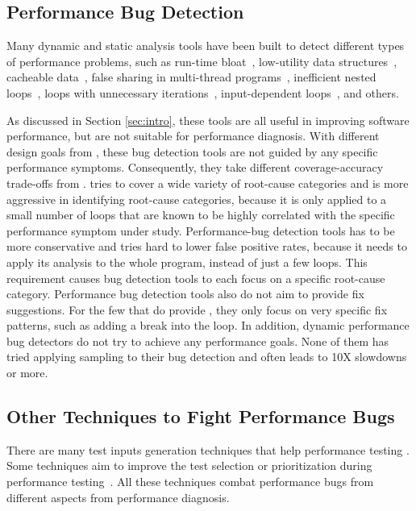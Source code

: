 \subsection{Performance Bug Detection}

Many dynamic and static analysis tools have been built to detect different
types of performance problems, such as 
run-time bloat~\cite{Dufour:2008:STC:1453101.1453111, Xu:2009:GFP:1542476.1542523, Xu:2010:DIC:1806596.1806616}, 
low-utility data structures~\cite{Xu:2010:FLD:1806596.1806617}, 
cacheable data~\cite{Cachetor}, false sharing in
multi-thread programs~\cite{Liu:2011:SPD:2048066.2048070},
inefficient nested loops~\cite{Alabama},
loops with unnecessary iterations~\cite{CARAMEL,IsilDillig.PLDI15},
input-dependent loops~\cite{xiao13:context}, and others. 

As discussed in 
Section \ref{sec:intro}, these tools are all useful in improving software
performance, but are not suitable for performance diagnosis.
With different design goals from \Tool, these bug detection tools are not 
guided by any specific
performance symptoms. Consequently, they take different coverage-accuracy
trade-offs from \Tool. \Tool tries to cover a wide variety of root-cause 
categories and is more aggressive in identifying root-cause categories, because
it is only applied to a small number of loops that are known to be highly
correlated with the specific performance symptom under study.
Performance-bug detection tools has to be more conservative and tries hard
to lower false positive rates, because it needs to apply its analysis to the
whole program, instead of just a few loops. This requirement causes bug
detection tools to each focus on a specific root-cause category.
Performance bug detection tools also do not aim to provide fix suggestions.
For the few that do provide \cite{CARAMEL}, they only focus on very specific
fix patterns, such as adding a break into the loop. 
In addition, dynamic performance bug detectors do not try to achieve any
performance goals. None of them has tried applying sampling to their
bug detection and often leads to 10X slowdowns or more.

\subsection{Other Techniques to Fight Performance Bugs}

There are many test inputs generation techniques that help
performance testing 
\cite{WISE, EventBreak, SpeedGun}.
Some techniques aim to improve the test selection or prioritization during 
performance testing~\cite{Forepost,Huang:2014:PRT:2568225.2568232}.  
All these techniques combat performance bugs from different aspects from performance diagnosis.
